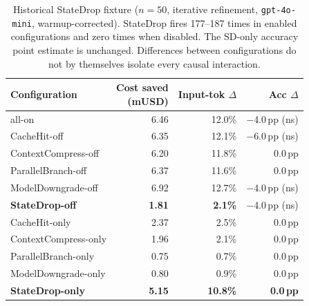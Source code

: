 \begin{table}[t]
\caption{Historical StateDrop fixture ($n=50$, iterative refinement, \texttt{gpt-4o-mini}, warmup-corrected). StateDrop fires 177--187 times in enabled configurations and zero times when disabled. The SD-only accuracy point estimate is unchanged. Differences between configurations do not by themselves isolate every causal interaction.}
\label{tab:sd-matrix}
\small
\begin{tabularx}{\columnwidth}{@{} X r r r @{}}
\toprule
Configuration & \makecell[r]{Cost saved\\(mUSD)} & \makecell[r]{Input-tok\\$\Delta$} & Acc $\Delta$ \\
\midrule
all-on                          & 6.46 & 12.0\%  & $-$4.0\,pp (ns) \\
CacheHit-off                    & 6.35 & 12.1\%  & $-$6.0\,pp (ns) \\
ContextCompress-off             & 6.20 & 11.8\%  & 0.0\,pp \\
ParallelBranch-off              & 6.37 & 11.6\%  & 0.0\,pp \\
ModelDowngrade-off              & 6.92 & 12.7\%  & $-$4.0\,pp (ns) \\
\textbf{StateDrop-off}          & \textbf{1.81} & \textbf{2.1\%}  & $-$4.0\,pp (ns) \\
\midrule
CacheHit-only                   & 2.37 & 2.5\%   & 0.0\,pp \\
ContextCompress-only            & 1.96 & 2.1\%   & 0.0\,pp \\
ParallelBranch-only             & 0.75 & 0.7\%   & 0.0\,pp \\
ModelDowngrade-only             & 0.80 & 0.9\%   & 0.0\,pp \\
\textbf{StateDrop-only}         & \textbf{5.15} & \textbf{10.8\%} & \textbf{0.0\,pp} \\
\bottomrule
\end{tabularx}
\end{table}

